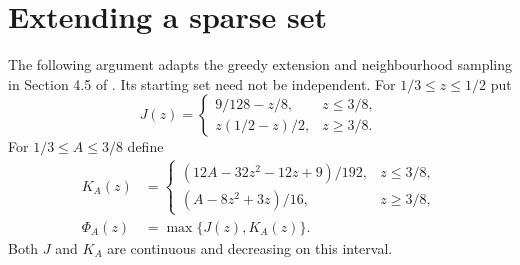\documentclass[12pt]{article}
\begin{document}
\section{Extending a sparse set}\label{sec:extension}
The following argument adapts the greedy extension and neighbourhood
sampling in Section 4.5 of \cite{razborov}. Its starting set need not be
independent. For $1/3\le z\le1/2$ put
\[
 J(z)=\begin{cases}9/128-z/8,&z\le3/8,\\
 z(1/2-z)/2,&z\ge3/8.\end{cases}
\]
For $1/3\le A\le3/8$ define
\begin{align*}
 K_A(z)&=\begin{cases}
 (12A-32z^2-12z+9)/192,&z\le3/8,\\
 (A-8z^2+3z)/16,&z\ge3/8,
 \end{cases}\\
 \Phi_A(z)&=\max\{J(z),K_A(z)\}.
\end{align*}
Both $J$ and $K_A$ are continuous and decreasing on this interval.
\end{document}
